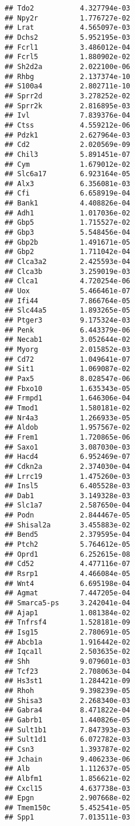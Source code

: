 \documentclass[
]{article}
\begin{document}
\begin{verbatim}
## Tdo2           4.327794e-03
## Npy2r          1.776727e-02
## Lrat           4.565097e-03
## Dchs2          5.952195e-03
## Fcrl1          3.486012e-04
## Fcrl5          1.880902e-02
## Sh2d2a         2.022100e-06
## Rhbg           2.137374e-10
## S100a4         2.802711e-10
## Sprr2d         3.278252e-02
## Sprr2k         2.816895e-03
## Ivl            7.839376e-04
## Ctss           4.559212e-06
## Pdzk1          2.627964e-03
## Cd2            2.020569e-09
## Chil3          5.891451e-07
## Cym            1.679012e-02
## Slc6a17        6.923164e-05
## Alx3           6.356081e-03
## Cfi            6.658919e-04
## Bank1          4.408826e-04
## Adh1           1.017036e-02
## Gbp5           1.715527e-02
## Gbp3           5.548456e-04
## Gbp2b          1.491671e-05
## Gbp2           1.711042e-04
## Clca3a2        2.425593e-04
## Clca3b         3.259019e-03
## Clca1          4.720254e-06
## Uox            5.466461e-07
## Ifi44          7.866764e-05
## Slc44a5        1.893265e-05
## Ptger3         9.175324e-03
## Penk           6.443379e-06
## Necab1         3.052644e-02
## Myorg          2.015852e-03
## Cd72           1.049641e-07
## Sit1           1.069087e-02
## Pax5           8.028547e-06
## Fbxo10         1.635343e-05
## Frmpd1         1.646306e-04
## Tmod1          1.580181e-02
## Nr4a3          1.266933e-05
## Aldob          1.957567e-02
## Frem1          1.720865e-06
## Saxo1          3.087030e-03
## Hacd4          6.952469e-07
## Cdkn2a         2.374030e-04
## Lrrc19         1.475260e-03
## Insl5          6.405528e-03
## Dab1           3.149328e-03
## Slc1a7         2.587650e-04
## Podn           2.844467e-05
## Shisal2a       3.455883e-02
## Bend5          2.379595e-04
## Ptch2          5.764612e-05
## Oprd1          6.252615e-08
## Cd52           4.477116e-07
## Rsrp1          4.466084e-05
## Wnt4           6.695198e-04
## Agmat          7.447205e-04
## Smarca5-ps     3.242041e-04
## Ajap1          1.081384e-02
## Tnfrsf4        1.528181e-09
## Isg15          2.780691e-05
## Abcb1a         1.916442e-02
## Iqca1l         2.503635e-02
## Shh            9.079601e-03
## Tcf23          2.708063e-04
## Hs3st1         1.284421e-09
## Rhoh           9.398239e-05
## Shisa3         2.268340e-03
## Gabra4         8.471822e-04
## Gabrb1         1.440826e-05
## Sult1b1        7.847393e-03
## Sult1d1        6.072782e-03
## Csn3           1.393787e-02
## Jchain         9.406233e-06
## Alb            1.112637e-05
## Albfm1         1.856621e-02
## Cxcl15         4.637738e-03
## Epgn           2.907668e-02
## Tmem150c       5.452541e-05
## Spp1           7.013511e-03

\end{verbatim}
\end{document}
